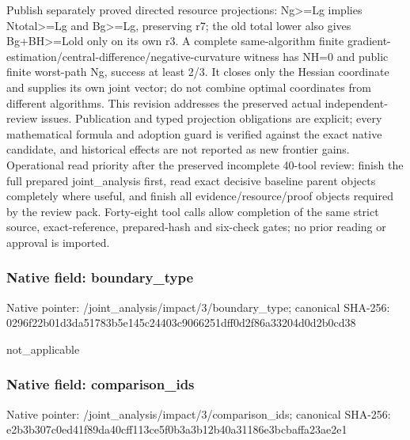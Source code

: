 \documentclass[10pt,a4paper]{article}
\begin{document}
\begingroup\raggedright\sloppy Publish separately proved directed resource projections:\allowbreak{} Ng>=\allowbreak{}Lg implies Ntotal>=\allowbreak{}Lg and Bg>=\allowbreak{}Lg,\allowbreak{} preserving r7;\allowbreak{} the old total lower also gives Bg+BH>=\allowbreak{}Lold only on its own r3. A complete same-algorithm finite gradient-estimation/\allowbreak{}central-difference/\allowbreak{}negative-curvature witness has NH=\allowbreak{}0 and public finite worst-path Ng,\allowbreak{} success at least 2/\allowbreak{}3. It closes only the Hessian coordinate and supplies its own joint vector;\allowbreak{} do not combine optimal coordinates from different algorithms. This revision addresses the preserved actual independent-review issues. Publication and typed projection obligations are explicit;\allowbreak{} every mathematical formula and adoption guard is verified against the exact native candidate,\allowbreak{} and historical effects are not reported as new frontier gains. Operational read priority after the preserved incomplete 40-tool review:\allowbreak{} finish the full prepared joint\_\allowbreak{}analysis first,\allowbreak{} read exact decisive baseline parent objects completely where useful,\allowbreak{} and finish all evidence/\allowbreak{}resource/\allowbreak{}proof objects required by the review pack. Forty-eight tool calls allow completion of the same strict source,\allowbreak{} exact-reference,\allowbreak{} prepared-hash and six-check gates;\allowbreak{} no prior reading or approval is imported.\par\endgroup

\subsubsection{Native field: boundary\_\allowbreak{}type}
Native pointer: /joint\_\allowbreak{}analysis/impact/3/boundary\_\allowbreak{}type; canonical SHA-256: 0296f22b01d3da51783b5e145c24403c9066251dff0d2f86a33204d0d2b0cd38

\begingroup\raggedright\sloppy not\_\allowbreak{}applicable\par\endgroup

\subsubsection{Native field: comparison\_\allowbreak{}ids}
Native pointer: /joint\_\allowbreak{}analysis/impact/3/comparison\_\allowbreak{}ids; canonical SHA-256: e2b3b307c0ed41f89da40cff113ce5f0b3a3b12b40a31186e3bcbaffa23ae2e1
\end{document}

